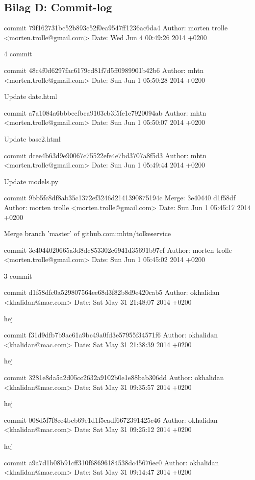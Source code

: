 \documentclass[12pt]{article}   %
\begin{document}
\subsection{Bilag D: Commit-log}

commit 79f162731bc52b893c52f0ea9547ff1236ac6da4
Author: morten trolle <morten.trolle@gmail.com>
Date:   Wed Jun 4 00:49:26 2014 +0200

    4 commit

commit 48c4f0d6297fac6179cd81f7d5ff0989901b42b6
Author: mhtn <morten.trolle@gmail.com>
Date:   Sun Jun 1 05:50:28 2014 +0200

    Update date.html

commit a7a1084a6bbbcefbca9103cb3f5fe1c7920094ab
Author: mhtn <morten.trolle@gmail.com>
Date:   Sun Jun 1 05:50:07 2014 +0200

    Update base2.html

commit dcee4b63d9e90067c75522efe4e7bd3707a8f5d3
Author: mhtn <morten.trolle@gmail.com>
Date:   Sun Jun 1 05:49:44 2014 +0200

    Update models.py

commit 9bb5fc8df8ab35c1372ef3246d2141390875194c
Merge: 3e40440 d1f58df
Author: morten trolle <morten.trolle@gmail.com>
Date:   Sun Jun 1 05:45:17 2014 +0200

    Merge branch 'master' of github.com:mhtn/tolkeservice

commit 3e4044020665a3d8dc853302c6941d35691b97cf
Author: morten trolle <morten.trolle@gmail.com>
Date:   Sun Jun 1 05:45:02 2014 +0200

    3 commit

commit d1f58dfc0a529807564ee68d3f82b8d9e420cab5
Author: okhalidan <khalidan@mac.com>
Date:   Sat May 31 21:48:07 2014 +0200

    hej

commit f31d9dfb7b9ac61a9bc49a0fd3e57955f34571f6
Author: okhalidan <khalidan@mac.com>
Date:   Sat May 31 21:38:39 2014 +0200

    hej

commit 3281e8da5a2d05cc2632a9102b0e1e88bab306dd
Author: okhalidan <khalidan@mac.com>
Date:   Sat May 31 09:35:57 2014 +0200

    hej

commit 008d5f7f8ce4bcb69e1d1f5cadf6672391425c46
Author: okhalidan <khalidan@mac.com>
Date:   Sat May 31 09:25:12 2014 +0200

    hej

commit a9a7d1b08b91cff310f68696184538dc45676ec0
Author: okhalidan <khalidan@mac.com>
Date:   Sat May 31 09:14:47 2014 +0200
\end{document}
